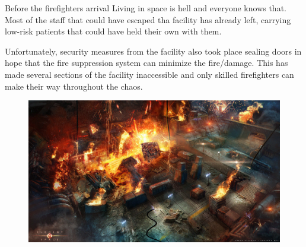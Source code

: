 \newsect

\begin{rpg-commentbox}{Before the firefighters arrival}
    Living in space is hell and everyone knows that. Most of the staff that could have escaped tha facility has already left, carrying low-risk patients that could have held their own with them. 

    Unfortunately, security measures from the facility also took place sealing doors in hope that the fire suppression system can minimize the fire/damage. 
    This has made several sections of the facility inaccessible and only skilled firefighters can make their way throughout the chaos.
\end{rpg-commentbox}


\newsect


\begin{figure}[!b]
    \centering
    \includegraphics[width=.45\textwidth]{img/bg/fire.jpg}
\end{figure}


\clearpage



